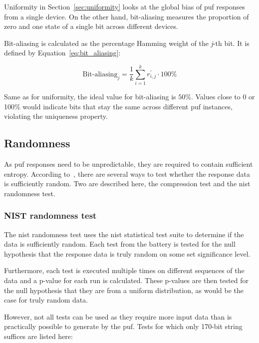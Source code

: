 Uniformity in Section~\ref{sec:uniformity} looks at the global bias of \gls{puf} responses from a single device. On the other hand, bit-aliasing measures the proportion of zero and one state of a single bit across different devices.

Bit-aliasing is calculated as the percentage Hamming weight of the \emph{j}-th bit. It is defined by Equation~\ref{eq:bit_aliasing}\cite{Maiti2011}:

\begin{equation}\label{eq:bit_aliasing}
    \textrm{Bit-aliasing}_{j} = \frac{1}{k}\sum_{i=1}^{k}r_{i, j}^{'} \cdot 100\%
\end{equation}

Same as for uniformity, the ideal value for bit-aliasing is $50\%$. Values close to 0 or 100\% would indicate bits that stay the same across different \gls{puf} instances, violating the uniqueness property.

\subsection{Randomness}

As \gls{puf} responses need to be unpredictable, they are required to contain sufficient entropy. According to~\cite{Leest2010}, there are several ways to test whether the response data is sufficiently random. Two are described here, the compression test and the \acrshort{nist} randomness test.

\subsubsection*{NIST randomness test}

The \acrshort{nist} randomness test uses the \acrshort{nist} statistical test suite to determine if the data is sufficiently random. Each test from the battery is tested for the null hypothesis that the response data is truly random on some set significance level.

Furthermore, each test is executed multiple times on different sequences of the data and a p-value for each run is calculated. These p-values are then tested for the null hypothesis that they are from a uniform distribution, as would be the case for truly random data.\cite{NIST2010}

However, not all tests can be used as they require more input data than is practically possible to generate by the \gls{puf}. Tests for which only 170-bit string suffices are listed here\cite{Leest2010}:

